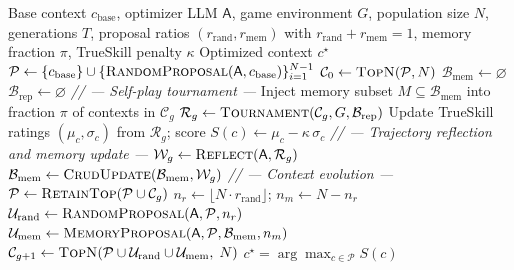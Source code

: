 \begin{algorithm}[H]
\caption{\NAME{}: Memory-Augmented Context Optimization}
\label{alg:memo_main}
\begin{algorithmic}[1]
\Require Base context $c_{\text{base}}$, optimizer LLM $\mathsf{A}$, game environment $G$, population size $N$, generations $T$, proposal ratios $(r_{\mathrm{rand}},r_{\mathrm{mem}})$ with $r_{\mathrm{rand}}{+}r_{\mathrm{mem}}{=}1$, memory fraction $\pi$, TrueSkill penalty $\kappa$
\Ensure Optimized context $c^\star$
\State $\mathcal{P} \gets \{c_{\text{base}}\} \cup \{\textsc{RandomProposal}(\mathsf{A}, c_{\text{base}})\}_{i=1}^{N-1}$ 
\State $\mathcal{C}_0 \gets \textsc{TopN}(\mathcal{P}, N)$ 
\State $\mathcal{B}_{\text{mem}} \gets \varnothing$ 
\State $\mathcal{B}_{\text{rep}} \gets \varnothing$ 
    \State \textit{// --- Self-play tournament ---}
    \State Inject memory subset $M \subseteq \mathcal{B}_{\text{mem}}$ into fraction $\pi$ of contexts in $\mathcal{C}_g$
    \State $\mathcal{R}_g \gets \textsc{Tournament}(\mathcal{C}_g, G, \mathcal{B}_{\text{rep}})$ 
    \State Update TrueSkill ratings $(\mu_c, \sigma_c)$ from $\mathcal{R}_g$; \; score $S(c) \gets \mu_c - \kappa\,\sigma_c$
    \State \textit{// --- Trajectory reflection and memory update ---}
    \State $\mathcal{W}_g \gets \textsc{Reflect}(\mathsf{A}, \mathcal{R}_g)$ 
    \State $\mathcal{B}_{\text{mem}} \gets \textsc{CrudUpdate}(\mathcal{B}_{\text{mem}}, \mathcal{W}_g)$ 
    \State \textit{// --- Context evolution ---}
    \State $\mathcal{P} \gets \textsc{RetainTop}(\mathcal{P} \cup \mathcal{C}_g)$ 
    \State $n_r \gets \lfloor N \cdot r_{\mathrm{rand}} \rfloor$; \;\; $n_m \gets N - n_r$
    \State $\mathcal{U}_{\mathrm{rand}} \gets \textsc{RandomProposal}(\mathsf{A}, \mathcal{P}, n_r)$ 
    \State $\mathcal{U}_{\mathrm{mem}} \gets \textsc{MemoryProposal}(\mathsf{A}, \mathcal{P}, \mathcal{B}_{\text{mem}}, n_m)$ 
    \State $\mathcal{C}_{g+1} \gets \textsc{TopN}(\mathcal{P} \cup \mathcal{U}_{\mathrm{rand}} \cup \mathcal{U}_{\mathrm{mem}},\; N)$
\EndFor
\State \Return $c^\star = \arg\max_{c \in \mathcal{P}} S(c)$
\end{algorithmic}
\end{algorithm}

